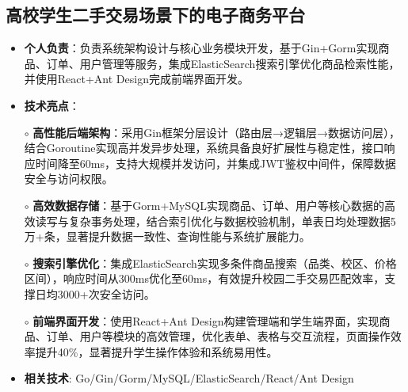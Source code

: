 \subsection{\textbf{高校学生二手交易场景下的电子商务平台} \hspace{2cm}{2024.10 -- 2024.12}}
  \begin{normalsize}
    \begin{itemize}
    \item \textbf{个人负责}：负责系统架构设计与核心业务模块开发，基于Gin+Gorm实现商品、订单、用户管理等服务，集成ElasticSearch搜索引擎优化商品检索性能，并使用React+Ant Design完成前端界面开发。
    \item \textbf{技术亮点}：
    \setlength{\itemindent}{1em} %
      \item[$\circ$] \textbf{高性能后端架构}：采用Gin框架分层设计（路由层→逻辑层→数据访问层），结合Goroutine实现高并发异步处理，系统具备良好扩展性与稳定性，接口响应时间降至60ms，支持大规模并发访问，并集成JWT鉴权中间件，保障数据安全与访问权限。
      \item[$\circ$] \textbf{高效数据存储}：基于Gorm+MySQL实现商品、订单、用户等核心数据的高效读写与复杂事务处理，结合索引优化与数据校验机制，单表日均处理数据5万+条，显著提升数据一致性、查询性能与系统扩展能力。
      \item[$\circ$] \textbf{搜索引擎优化}：集成ElasticSearch实现多条件商品搜索（品类、校区、价格区间），响应时间从300ms优化至60ms，有效提升校园二手交易匹配效率，支撑日均3000+次安全访问。
      \item[$\circ$] \textbf{前端界面开发}：使用React+Ant Design构建管理端和学生端界面，实现商品、订单、用户等模块的高效管理，优化表单、表格与交互流程，页面操作效率提升40\%，显著提升学生操作体验和系统易用性。
    \setlength{\itemindent}{0em} %
    \item \textbf{相关技术}: Go/Gin/Gorm/MySQL/ElasticSearch/React/Ant Design
    \end{itemize}
  \end{normalsize}